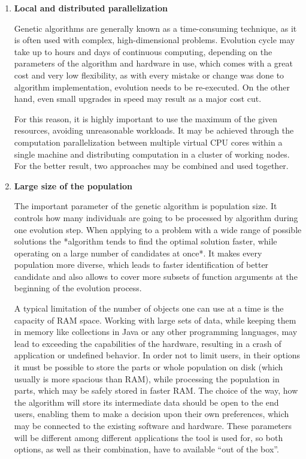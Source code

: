\begin{enumerate}
\item
\textbf{Local and distributed parallelization}

Genetic algorithms are generally known as a time-consuming technique, as it is often used with complex, high-dimensional problems. Evolution cycle may take up to hours and days of continuous computing, depending on the parameters of the algorithm and hardware in use, which comes with a great cost and very low flexibility, as with every mistake or change was done to algorithm implementation, evolution needs to be re-executed. On the other hand, even small upgrades in speed may result as a major cost cut.

For this reason, it is highly important to use the maximum of the given resources, avoiding unreasonable workloads. It may be achieved through the computation parallelization between multiple virtual CPU cores within a single machine and distributing computation in a cluster of working nodes. For the better result, two approaches may be combined and used together.
\\

\item 
\textbf{Large size of the population}

The important parameter of the genetic algorithm is population size. It controls how many individuals are going to be processed by algorithm during one evolution step. When applying to a problem with a wide range of possible solutions the *algorithm tends to find the optimal solution faster, while operating on a large number of candidates at once*. It makes every population more diverse, which leads to faster identification of better candidate and also allows to cover more subsets of function arguments at the beginning of the evolution process.

A typical limitation of the number of objects one can use at a time is the capacity of RAM space. Working with large sets of data, while keeping them in memory like collections in Java or any other programming languages, may lead to exceeding the capabilities of the hardware, resulting in a crash of application or undefined behavior. In order not to limit users, in their options it must be possible to store the parts or whole population on disk (which usually is more spacious than RAM), while processing the population in parts, which may be safely stored in faster RAM. The choice of the way, how the algorithm will store its intermediate data should be open to the end users, enabling them to make a decision upon their own preferences, which may be connected to the existing software and hardware. These parameters will be different among different applications the tool is used for, so both options, as well as their combination, have to available ``out of the box''.
\\


\end{enumerate}
